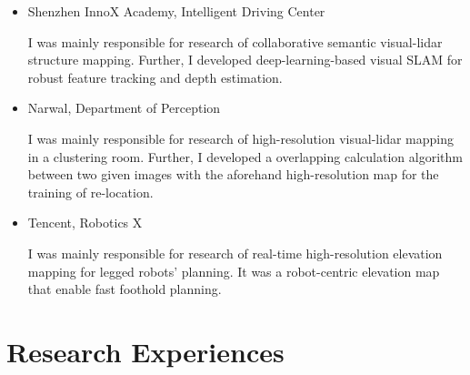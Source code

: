 \documentclass[11pt,a4paper,sans]{moderncv}        %
\begin{document}
\begin{itemize}

\item{Shenzhen InnoX Academy, Intelligent Driving Center

I was mainly responsible for research of collaborative semantic visual-lidar structure mapping. Further, I developed deep-learning-based visual SLAM for robust feature tracking and depth estimation.}

\item{Narwal, Department of Perception

I was mainly responsible for research of high-resolution visual-lidar mapping in a clustering room. Further, I developed a overlapping calculation algorithm between two given images with the aforehand high-resolution map for the training of re-location.}

\item{Tencent, Robotics X

I was mainly responsible for research of real-time high-resolution elevation mapping for legged robots' planning. It was a robot-centric elevation map that enable fast foothold planning.
}

\end{itemize}

\section{Research Experiences}
\end{document}
